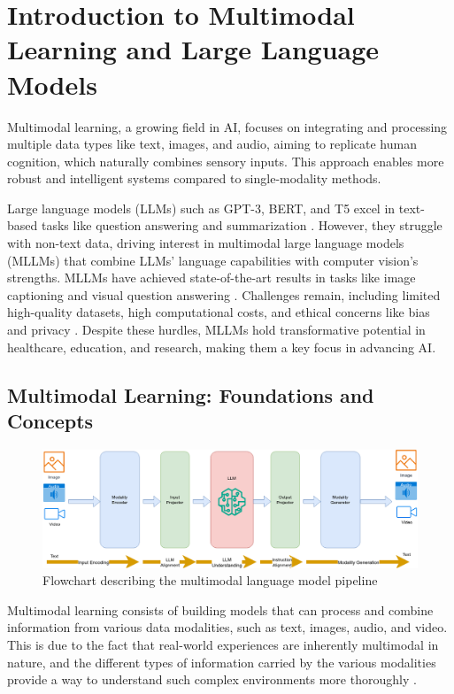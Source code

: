 \documentclass[runningheads]{llncs}
\begin{document}
\section{Introduction to Multimodal Learning and Large Language Models}

Multimodal learning, a growing field in AI, focuses on integrating and processing multiple data types like text, images, and audio, aiming to replicate human cognition, which naturally combines sensory inputs. This approach enables more robust and intelligent systems compared to single-modality methods.

Large language models (LLMs) such as GPT-3, BERT, and T5 excel in text-based tasks like question answering and summarization \cite{ref1}. However, they struggle with non-text data, driving interest in multimodal large language models (MLLMs) that combine LLMs’ language capabilities with computer vision's strengths. MLLMs have achieved state-of-the-art results in tasks like image captioning and visual question answering \cite{ref2}. Challenges remain, including limited high-quality datasets, high computational costs, and ethical concerns like bias and privacy \cite{ref11}. Despite these hurdles, MLLMs hold transformative potential in healthcare, education, and research, making them a key focus in advancing AI.

\subsection{Multimodal Learning: Foundations and Concepts}

\begin{figure}[h!]
		\centering
		\includegraphics[width=\textwidth]{MMSystemDesign.png} %
		\caption{Flowchart describing the multimodal language model pipeline }
		\label{fig:multimodal_learning2}
        \vspace{-1em}
	\end{figure}

Multimodal learning consists of building models that can process and combine information from various data modalities, such as text, images, audio, and video. This is due to the fact that real-world experiences are inherently multimodal in nature, and the different types of information carried by the various modalities provide a way to understand such complex environments more thoroughly \cite{ref11}.
\end{document}
